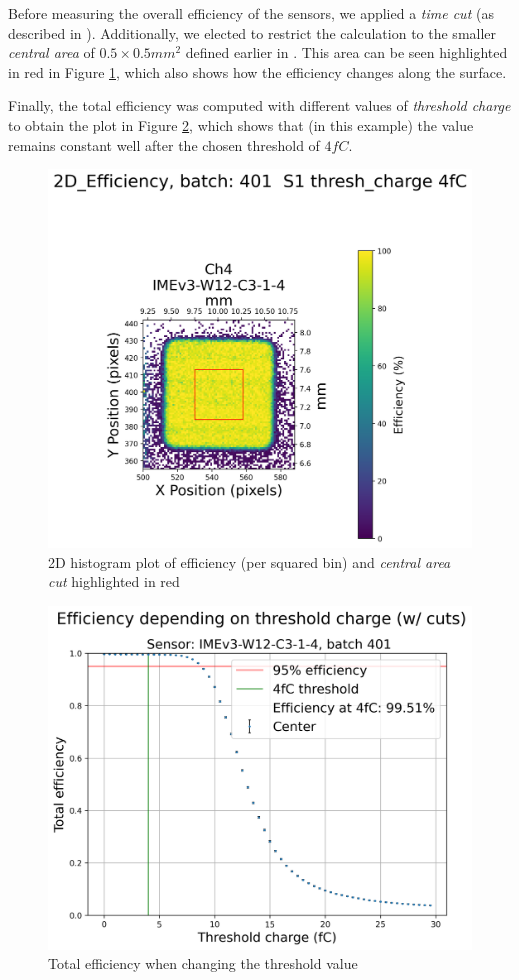 Before measuring the overall efficiency of the sensors, we applied a \textit{time cut} (as described in ). Additionally, we elected to restrict the calculation to the smaller \textit{central area} of \(0.5\times0.5\si{mm^2}\) defined earlier in . This area can be seen highlighted in red in Figure \ref{fig:efficiency_2D_plot}, which also shows how the efficiency changes along the surface.

Finally, the total efficiency was computed with different values of \textit{threshold charge} to obtain the plot in Figure \ref{fig:efficiency_depending_threshold}, which shows that (in this example) the value remains constant well after the chosen threshold of \(4\si{fC}\).

\begin{figure}
    \centering
    \includegraphics[width=0.7\linewidth]{Images/efficiency_plots/2D Efficiency_401_S1_with_center_highlight_DUTs_3.png}
    \caption{2D histogram plot of efficiency (per squared bin) and \textit{central area cut} highlighted in red}
    \label{fig:efficiency_2D_plot}
\end{figure}

\begin{figure}
    \centering
    \includegraphics[width=0.5\linewidth]{Images/efficiency_plots/Efficiency depending on threshold charge (with cuts) batch 401 S1.png}
    \caption{Total efficiency when changing the threshold value}
    \label{fig:efficiency_depending_threshold}
\end{figure}


